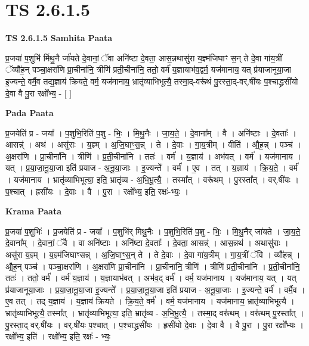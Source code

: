 \documentclass[17pt]{extarticle}
\begin{document}
\section{ TS 2.6.1.5 }

\textbf{TS 2.6.1.5 } \newline
\textbf{Samhita Paata} \newline

प्र॒जया॑ प॒शुभि॑ र्मिथु॒नै र्जा॑यते दे॒वानां॒ ॅवा अनि॑ष्टा दे॒वता॒ आस॒न्नथासु॑रा य॒ज्ञ्म॑जिघाꣳ स॒न् ते दे॒वा गा॑य॒त्रीं ॅव्यौ॑ह॒न् पञ्चा॒क्षरा॑णि प्रा॒चीना॑नि॒ त्रीणि॑ प्रती॒चीना॑नि॒ ततो॒ वर्म॑ य॒ज्ञायाभ॑व॒द्वर्म॒ यज॑मानाय॒ यत् प्र॑याजानूया॒जा इ॒ज्यन्ते॒ वर्मै॒व तद्य॒ज्ञाय॑ क्रियते॒ वर्म॒ यज॑मानाय॒ भ्रातृ॑व्याभिभूत्यै॒ तस्मा॒द्-वरू॑थं पु॒रस्ता॒द्-वर्.षी॑यः प॒श्चाद्ध्रसी॑यो दे॒वा वै पु॒रा रक्षो᳚भ्य॒ - [  ] \newline

\textbf{Pada Paata} \newline

प्र॒जयेति॑ प्र - जया᳚ । प॒शुभि॒रिति॑ प॒शु - भिः॒ । मि॒थु॒नैः । जा॒य॒ते॒ । दे॒वाना᳚म् । वै । अनि॑ष्टाः । दे॒वताः᳚ । आसन्न्॑ । अथ॑ । असु॑राः । य॒ज्ञ्म् । अ॒जि॒घाꣳ॒॒स॒न्न् । ते । दे॒वाः । गा॒य॒त्रीम् । वीति॑ । औ॒ह॒न्न् । पञ्च॑ । अ॒क्षरा॑णि । प्रा॒चीना॑नि । त्रीणि॑ । प्र॒ती॒चीना॑नि । ततः॑ । वर्म॑ । य॒ज्ञाय॑ । अभ॑वत् । वर्म॑ । यज॑मानाय । यत् । प्र॒या॒जा॒नू॒या॒जा इति॑ प्रयाज - अ॒नू॒या॒जाः । इ॒ज्यन्ते᳚ । वर्म॑ । ए॒व । तत् । य॒ज्ञाय॑ । क्रि॒य॒ते॒ । वर्म॑ । यज॑मानाय । भ्रातृ॑व्याभिभूत्या॒ इति॒ भ्रातृ॑व्य - अ॒भि॒भू॒त्यै॒ । तस्मा᳚त् । वरू॑थम् । पु॒रस्ता᳚त् । वर्.षी॑यः । प॒श्चात् । ह्रसी॑यः । दे॒वाः । वै । पु॒रा । रक्षो᳚भ्य॒ इति॒ रक्षः॑-भ्यः॒ ।  \newline


\textbf{Krama Paata} \newline

प्र॒जया॑ प॒शुभिः॑ । प्र॒जयेति॑ प्र - जया᳚ । प॒शुभि॑र् मिथु॒नैः । प॒शुभि॒रिति॑ प॒शु - भिः॒ । मि॒थु॒नैर् जा॑यते । जा॒य॒ते॒ दे॒वाना᳚म् । दे॒वानां॒ ॅवै । वा अनि॑ष्टाः । अनि॑ष्टा दे॒वताः᳚ । दे॒वता॒ आसन्न्॑ । आस॒न्नथ॑ । अथासु॑राः । असु॑रा य॒ज्ञ्म् । य॒ज्ञ्म॑जिघाꣳसन्न् । अ॒जि॒घाꣳ॒॒स॒न् ते । ते दे॒वाः । दे॒वा गा॑य॒त्रीम् । गा॒य॒त्रीं ॅवि । व्यौ॑हन्न् । औ॒ह॒न् पञ्च॑ । पञ्चा॒क्षरा॑णि । अ॒क्षरा॑णि प्रा॒चीना॑नि । प्रा॒चीना॑नि॒ त्रीणि॑ । त्रीणि॑ प्रती॒चीना॑नि । प्र॒ती॒चीना॑नि॒ ततः॑ । ततो॒ वर्म॑ । वर्म॑ य॒ज्ञाय॑ । य॒ज्ञायाभ॑वत् । अभ॑व॒द् वर्म॑ । वर्म॒ यज॑मानाय । यज॑मानाय॒ यत् । यत् प्र॑याजानूया॒जाः । प्र॒या॒जा॒नू॒या॒जा इ॒ज्यन्ते᳚ । प्र॒या॒जा॒नू॒या॒जा इति॑ प्रयाज - अ॒नू॒या॒जाः । इ॒ज्यन्ते॒ वर्म॑ । वर्मै॒व । ए॒व तत् । तद् य॒ज्ञाय॑ । य॒ज्ञाय॑ क्रियते । क्रि॒य॒ते॒ वर्म॑ । वर्म॒ यज॑मानाय । यज॑मानाय॒ भ्रातृ॑व्याभिभूत्यै । भ्रातृ॑व्याभिभूत्यै॒ तस्मा᳚त् । भ्रातृ॑व्याभिभूत्या॒ इति॒ भ्रातृ॑व्य - अ॒भि॒भू॒त्यै॒ । तस्मा॒द् वरू॑थम् । वरू॑थम् पु॒रस्ता᳚त् । पु॒रस्ता॒द् वर्.षी॑यः । वर्.षी॑यः प॒श्चात् । प॒श्चाद्ध्रसी॑यः । ह्रसी॑यो दे॒वाः । दे॒वा वै । वै पु॒रा । पु॒रा रक्षो᳚भ्यः । रक्षो᳚भ्य॒ इति॑ । रक्षो᳚भ्य॒ इति॒ रक्षः॑ - भ्यः॒ \newline
\end{document}
